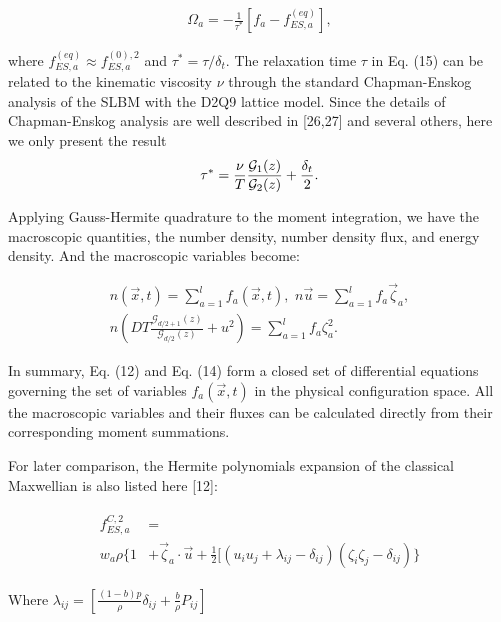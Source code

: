 \documentclass[doublecol]{epl2}
\begin{document}
\begin{align}
 \Omega_a = -\frac{1}{\tau^*}[f_a - f_{ES,a}^{(eq)}],
\end{align}

where $f_{ES,a}^{(eq)} \approx f_{ES,a}^{(0),2}$ and $\tau^*= \tau/\delta_t$.
The relaxation time $\tau$ in Eq. (15) can be
related to the kinematic viscosity $\nu$ through the standard
Chapman-Enskog analysis of the SLBM with the D2Q9 lattice model.
Since the details of Chapman-Enskog analysis are well described in
[26,27] and several others, here we only present the result
\begin{align}
 \tau^* = {\nu \over T} {\mathcal{G}_{1}(z) \over \mathcal{G}_{2}(z)}+\frac{\delta_t}{2}.
\end{align}

Applying Gauss-Hermite quadrature to the moment integration, we have the macroscopic quantities, the number density, number density flux, and energy density. And the macroscopic variables become:

\begin{align}
n(\vec x, t) = \sum_{a=1}^l  f_a(\vec x, t), \,\,
n\vec u = \sum_{a=1}^l  f_a \vec \zeta_a, \nonumber \\
 n (DT \frac{\mathcal{G}_{d/2+1}(z)}{\mathcal{G}_{d/2}(z)} + u^2) = \sum_{a=1}^l f_a \zeta_a^2.
\end{align}

In summary, Eq. (12) and Eq. (14) form a closed set of differential equations governing the set of variables $f_a(\vec x,t)$ in the physical configuration space.  All the macroscopic variables and their fluxes can be calculated directly from their corresponding moment summations.

For later comparison, the Hermite polynomials expansion of the classical Maxwellian is also listed here [12]:

\begin{align}
\begin{split}
f_{ES,a}^{C,2} &=  \\
w_a \rho \{ 1 &+ \vec \zeta_a \cdot \vec u + \frac{1}{2} [( u_i u_j +\lambda_{ij} -\delta_{ij})(\zeta_i \zeta_j - \delta_{ij}) \} 
\end{split}
\end{align}

Where $\lambda_{i j} = \left[\frac{(1-b)p}{\rho} \delta_{i j}+ \frac{b}{\rho}P_{i j } \right]$ \\
\end{document}
